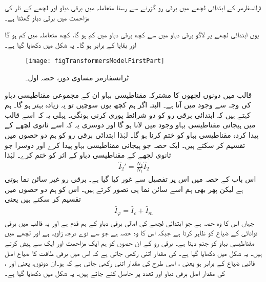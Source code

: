 ٹرانسفارمر کے ابتدائی لچھے میں برقی رو   گزرنے سے رستا متعاملہ میں  برقی دباو اور لچھے کے تار کی مزاحمت  میں
  برقی دباو گھٹتا ہے۔

یوں ابتدائی لچھے  پر لاگو برقی دباو  میں سے کچھ برقی دباو  میں کم ہو گا،  کچھ  متعاملہ  میں کم ہو گا اور بقایا   کے برابر ہو گا۔  یہ شکل   میں دکھایا گیا ہے۔
\begin{figure}
\centering
\texttt{[image: figTransformersModelFirstPart]}
\caption{ٹرانسفارمر مساوی دور، حصہ اول۔}
\label{شکل_ٹرانسفارمر_ماڈل_حصہ_اول}
\end{figure}
%

قالب میں دونوں لچھوں کا مشترکہ مقناطیسی بہاو ان کے مجموعی مقناطیسی دباو کی وجہ سے وجود میں آتا ہے۔ البتہ اگر ہم کچھ یوں سوچیں تو یہ زیادہ بہتر ہو گا۔ ہم کہتے ہیں کہ ابتدائی برقی رو کو دو شرائط پوری کرنی ہونگی۔ پہلی یہ کہ اسے قالب میں ہیجانی مقناطیسی بہاو وجود میں لانا ہو گا اور دوسری یہ کہ اسے ثانوی لچھے کے پیدا کردہ مقناطیسی بہاو کو ختم کرنا ہو گا۔ لہٰذا ابتدائی برقی رو کو ہم دو حصوں میں تقسیم کر سکتے ہیں۔ ایک حصہ  جو ہیجانی مقناطیسی بہاو پیدا کرے اور دوسرا  جو ثانوی لچھے کے مقناطیسی دباو کے اثر کو ختم کرے۔ لہٰذا
\begin{align}
\hat{I}_2'=\frac{N_2}{N_1} \hat{I}_2
\end{align}
	اس باب کے حصہ   میں اس پر تفصیل سے غور کیا گیا ہے۔ برقی رو  غیر سائن نما ہوتی ہے لیکن پھر بھی  ہم اسے سائن نما   ہی تصور کرتے ہیں۔ اس کو ہم دو حصوں میں تقسیم کر سکتے ہیں یعنی
\begin{align}\label{مساوات_ٹرانسفارمر_رو_ہیجان_ضیاع_اجزاع}
\hat{I}_\varphi=\hat{I}_c+\hat{I}_m
\end{align}
جہاں  اس کا وہ حصہ ہے جو ابتدائی لچھے کی امالی برقی دباو  کے ہم قدم ہے اور یہ قالب میں برقی توانائی کے ضیاع کو ظاہر کرتا ہے جبکہ  اس کا وہ حصہ ہے جو  سے نوے درجہ زاویہ   ہے اور  لچھے میں مقناطیسی بہاو کو جنم دیتا ہے۔ برقی رو کے ان حصوں کو ہم  ایک مزاحمت   اور ایک  سے پیش کرتے ہیں۔ یہ شکل میں دکھایا گیا ہے۔ کی مقدار اتنی رکھی جاتی ہے کہ اس میں برقی طاقت کا ضیاع اصل قالبی ضیاع کے برابر ہو یعنی  ، اسی طرح  کی مقدار اتنی رکھی جاتی ہے کہ  ہو۔ان دونوں،  یعنی  اور  ، کی مقدار اصل برقی دباو اور تعدد پر حاصل کئے جاتے ہیں۔ یہ شکل   میں دکھایا گیا ہے۔


